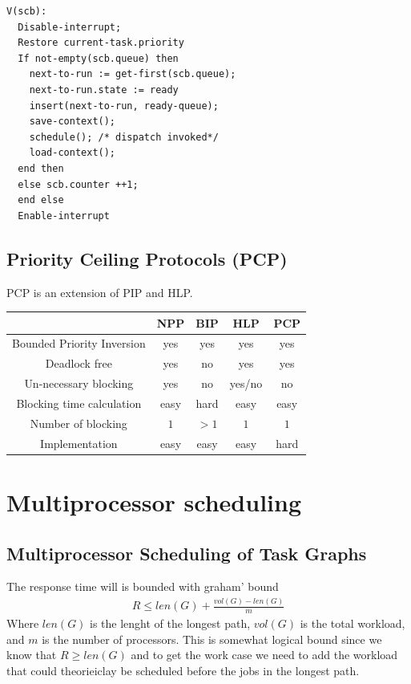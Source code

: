 \begin{verbatim}
V(scb):
  Disable-interrupt;
  Restore current-task.priority
  If not-empty(scb.queue) then
    next-to-run := get-first(scb.queue);
    next-to-run.state := ready
    insert(next-to-run, ready-queue);
    save-context();
    schedule(); /* dispatch invoked*/
    load-context();
  end then
  else scb.counter ++1;
  end else
  Enable-interrupt
\end{verbatim}


\subsection{Priority Ceiling Protocols (PCP)}
PCP is an extension of PIP and HLP.



\begin{table}[H]
  \centering
\begin{tabular}{ |c|c|c|c|c| } 
  \hline
                             & NPP  & BIP  & HLP    & PCP \\
  \hline
  Bounded Priority Inversion & yes  & yes  & yes    & yes \\
  \hline
  Deadlock free              & yes  & no   & yes    & yes \\
  \hline
  Un-necessary blocking      & yes  & no   & yes/no & no \\
  \hline
  Blocking time calculation  & easy & hard & easy   & easy \\
  \hline
  Number of blocking         & $1$  & $>1$ & $1$    & $1$ \\
  \hline
  Implementation             & easy & easy & easy   & hard \\
  \hline
\end{tabular}
\end{table}


\section{Multiprocessor scheduling}

\subsection{Multiprocessor Scheduling of Task Graphs}
The response time will is bounded with graham' bound
\begin{align*}
  R \leq len(G) + \frac{vol(G) - len(G)}{m}
\end{align*}
Where $len(G)$ is the lenght of the longest path, $vol(G)$ is the 
total workload, and $m$ is the number of processors. This is somewhat 
logical bound since we know that $R \geq len(G)$ and to get the work case 
we need to add the workload that could theorieiclay be scheduled before 
the jobs in the longest path.

